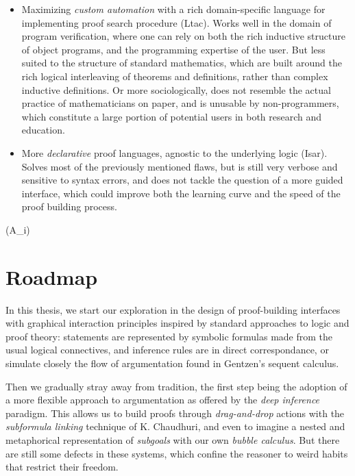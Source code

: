 \begin{itemize}
  \item Maximizing \emph{custom automation} with a rich domain-specific language
  for implementing proof search procedure (Ltac). Works well in the domain of
  program verification, where one can rely on both the rich inductive structure
  of object programs, and the programming expertise of the user. But less suited
  to the structure of standard mathematics, which are built around the rich
  logical interleaving of theorems and definitions, rather than complex
  inductive definitions. Or more sociologically, does not resemble the actual
  practice of mathematicians on paper, and is unusable by non-programmers, which
  constitute a large portion of potential users in both research and education.
  \item More \emph{declarative} proof languages, agnostic to the underlying
  logic (Isar). Solves most of the previously mentioned flaws, but is still very
  verbose and sensitive to syntax errors, and does not tackle the question of a
  more guided interface, which could improve both the learning curve and the
  speed of the proof building process.
\end{itemize}(\Gamma \limp A_i)

\section{Roadmap}

In this thesis, we start our exploration in the design of proof-building
interfaces with graphical interaction principles inspired by standard approaches
to logic and proof theory: statements are represented by symbolic formulas made
from the usual logical connectives, and inference rules are in direct
correspondance, or simulate closely the flow of argumentation found in Gentzen's
sequent calculus.

Then we gradually stray away from tradition, the first step being the adoption
of a more flexible approach to argumentation as offered by the \emph{deep
inference} paradigm. This allows us to build proofs through \emph{drag-and-drop}
actions with the \emph{subformula linking} technique of K. Chaudhuri, and even
to imagine a nested and metaphorical representation of \emph{subgoals} with our
own \emph{bubble calculus}. But there are still some defects in these systems,
which confine the reasoner to weird habits that restrict their freedom.

